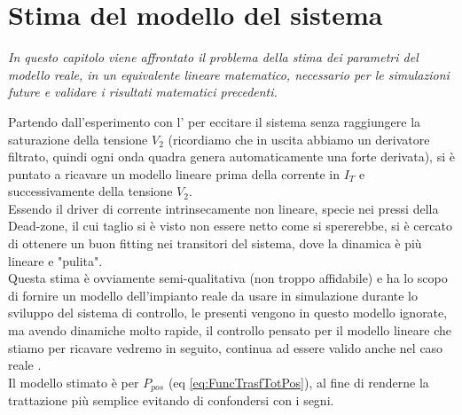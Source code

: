 \chapter{Stima del modello del sistema}\label{cap:stimaModello}

\begin{minipage}{12cm}\textit{
		In questo capitolo viene affrontato il problema della stima dei parametri del modello reale, in un equivalente lineare matematico, necessario per le simulazioni future e validare i risultati matematici precedenti.}
\end{minipage}

\vspace*{1cm}
\noindent
Partendo dall'esperimento con l' per eccitare il sistema senza raggiungere la saturazione della tensione $ V_2 $ (ricordiamo che in uscita abbiamo un derivatore filtrato, quindi ogni onda quadra genera automaticamente una forte derivata), si è puntato a ricavare un modello lineare prima della corrente in $ I_T $ e successivamente della tensione $ V_2 $.\\
Essendo il driver di corrente intrinsecamente non lineare, specie nei pressi della Dead-zone, il cui taglio si è visto non essere netto come si spererebbe, si è cercato di ottenere un buon fitting nei transitori del sistema, dove la dinamica è più lineare e "pulita".\\
Questa stima è ovviamente semi-qualitativa (non troppo affidabile) e ha lo scopo di fornire un modello dell'impianto reale da usare in simulazione durante lo sviluppo del sistema di controllo, le \nonLinearita presenti vengono in questo modello ignorate, ma avendo dinamiche molto rapide, il controllo pensato per il modello lineare che stiamo per ricavare vedremo in seguito, continua ad essere valido anche nel caso reale \nonLineare.\\
Il modello stimato è per $ P_{pos} $ (eq \ref{eq:FuncTrasfTotPos}), al fine di renderne la trattazione più semplice evitando di confondersi con i segni.

\newpage

